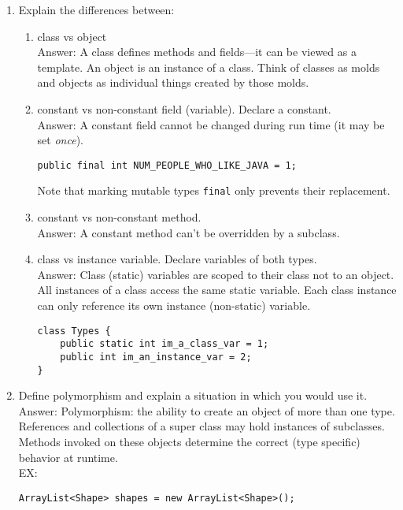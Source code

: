 \documentclass[11pt]{article}
\newenvironment{answer}{\large\lstset{basicstyle=\tiny\ttfamily}\color{white} \small{Answer:}}{}
\newenvironment{answer}{\large\lstset{basicstyle=\large\ttfamily}\color{red} \small{Answer:}}{}
\begin{document}
\begin{enumerate}
\item Explain the differences between:
\begin{enumerate}
	\item class vs object \\
	\begin{answer}
	A class defines methods and fields---it can be viewed as a template. An object is an instance of a class. Think of classes as molds and objects as individual things created by those molds.
	\end{answer}	
	
	\item constant vs non-constant field (variable).  Declare a constant. \\
	\begin{answer}
	A constant field cannot be changed during run time (it may be set {\em once}).
		\begin{lstlisting}[numbers=none]
public final int NUM_PEOPLE_WHO_LIKE_JAVA = 1;
		\end{lstlisting}
	Note that marking mutable types \texttt{final} only prevents their replacement.
	\end{answer}
	
	\item constant vs non-constant method.  \\
	\begin{answer}
	A constant method can't be overridden by a subclass.
	\end{answer}

	\item class vs instance variable.  Declare variables of both types.\\
	\begin{answer}
	Class (static) variables are scoped to their class not to an object.  All instances of a class access the same static variable.  Each class instance can only reference its own instance (non-static) variable.
		\begin{lstlisting}[numbers=none]
class Types {
	public static int im_a_class_var = 1;
	public int im_an_instance_var = 2;
}
		\end{lstlisting}
	\end{answer}
	
\end{enumerate}



\item Define polymorphism and explain a situation in which you would use it. \\
\begin{answer}
Polymorphism: the ability to create an object of more than one type. References and collections of a super class may hold instances of subclasses. Methods invoked on these objects determine the correct (type specific) behavior at runtime. \\
EX:
		\begin{lstlisting}
ArrayList<Shape> shapes = new ArrayList<Shape>();


\end{lstlisting}
\end{answer}
\end{enumerate}
\end{document}
